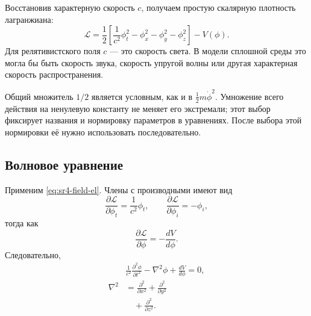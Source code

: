 Восстановив характерную скорость \(c\), получаем простую скалярную плотность лагранжиана:
\begin{equation}
\boxed{
\mathcal{L}
=
\frac12
\left[
\frac{1}{c^2}\phi_t^2
-\phi_x^2-\phi_y^2-\phi_z^2
\right]
-V(\phi)
}.
\label{eq:sr4-scalar-lagrangian}
\end{equation}
Для релятивистского поля \(c\) — это скорость света. В модели сплошной среды это могла бы быть скорость звука, скорость упругой волны или другая характерная скорость распространения.

Общий множитель \(1/2\) является условным, как и в \(\tfrac12m\dot\phi^2\). Умножение всего действия на ненулевую константу не меняет его экстремали; этот выбор фиксирует названия и нормировку параметров в уравнениях. После выбора этой нормировки её нужно использовать последовательно.

\begin{classroomqa}
\end{classroomqa}

\subsection{Волновое уравнение}

Применим \eqref{eq:sr4-field-el}. Члены с производными имеют вид
\begin{equation}
\frac{\partial\mathcal{L}}{\partial\phi_t}
=\frac{1}{c^2}\phi_t,
\qquad
\frac{\partial\mathcal{L}}{\partial\phi_i}
=-\phi_i,
\end{equation}
тогда как
\begin{equation}
\frac{\partial\mathcal{L}}{\partial\phi}
=-\frac{dV}{d\phi}.
\end{equation}
Следовательно,
\begin{equation}
\begin{aligned}
&\boxed{
\frac{1}{c^2}\frac{\partial^2\phi}{\partial t^2}
-\nabla^2\phi
+\frac{dV}{d\phi}
=0
},\\[0.5em]
\nabla^2
&=
\frac{\partial^2}{\partial x^2}
+\frac{\partial^2}{\partial y^2}\\
&\quad
+\frac{\partial^2}{\partial z^2}.
\end{aligned}
\label{eq:sr4-general-scalar-eom}
\end{equation}

